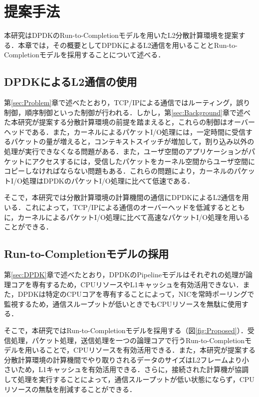 \section{提案手法}
\label{sec:Proposed}
本研究はDPDKのRun-to-Completionモデルを用いたL2分散計算環境を提案する．本章では，その概要としてDPDKによるL2通信を用いることとRun-to-Completionモデルを採用することについて述べる．

\subsection{DPDKによるL2通信の使用}
第\ref{sec:Problem}章で述べたとおり，TCP/IPによる通信ではルーティング，誤り制御，順序制御といった制御が行われる．しかし，第\ref{sec:Background}章で述べた本研究が提案する分散計算環境の前提を踏まえると，これらの制御はオーバーヘッドである．また，カーネルによるパケットI/O処理には，一定時間に受信するパケットの量が増えると，コンテキストスイッチが増加して，割り込み以外の処理が実行できなくなる問題がある．また，ユーザ空間のアプリケーションがパケットにアクセスするには，受信したパケットをカーネル空間からユーザ空間にコピーしなければならない問題もある．これらの問題により，カーネルのパケットI/O処理はDPDKのパケットI/O処理に比べて低速である．

そこで，本研究では分散計算環境の計算機間の通信にDPDKによるL2通信を用いる．これによって，TCP/IPによる通信のオーバーヘッドを低減するとともに，カーネルによるパケットI/O処理に比べて高速なパケットI/O処理を用いることができる．

\subsection{Run-to-Completionモデルの採用}
第\ref{sec:DPDK}章で述べたとおり，DPDKのPipelineモデルはそれぞれの処理が論理コアを専有するため，CPUリソースやL1キャッシュを有効活用できない．また，DPDKは特定のCPUコアを専有することによって，NICを常時ポーリングで監視するため，通信スループットが低いときでもCPUリソースを無駄に使用する．

そこで，本研究ではRun-to-Completionモデルを採用する（図\ref{fig:Proposed}）．受信処理，パケット処理，送信処理を一つの論理コアで行うRun-to-Completionモデルを用いることで，CPUリソースを有効活用できる．また，本研究が提案する分散計算環境の計算機間でやり取りされるデータのサイズはL2フレームより小さいため，L1キャッシュを有効活用できる．さらに，接続された計算機が協調して処理を実行することによって，通信スループットが低い状態にならず，CPUリソースの無駄を削減することができる．

